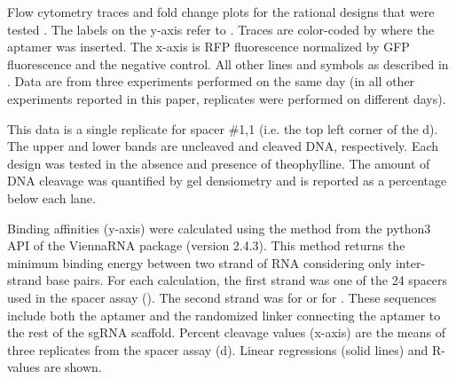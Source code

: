 \documentclass[10pt,oneside]{article}
\begin{document}


      Flow cytometry traces and fold change plots for the rational designs that were tested \invivo{}.  The labels on the y-axis refer to .  Traces are color-coded by where the aptamer was inserted.  The x-axis is RFP fluorescence normalized by GFP fluorescence and the negative control.  All other lines and symbols as described in .  Data are from three experiments performed on the same day (in all other experiments reported in this paper, replicates were performed on different days).



      This data is a single replicate for spacer \#1,1 (i.e. the top left corner of the d).  The upper and lower bands are uncleaved and cleaved DNA, respectively.  Each design was tested in the absence and presence of theophylline.  The amount of DNA cleavage was quantified by gel densiometry and is reported as a percentage below each lane.



     Binding affinities (y-axis) were calculated using the  method from the python3 API of the ViennaRNA package (version 2.4.3).  This method returns the minimum binding energy between two strand of RNA considering only inter-strand base pairs.  For each calculation, the first strand was one of the 24  spacers used in the \invitro{} spacer assay ().  The second strand was  for \ligrnaF{} or  for \ligrnaB{}.  These sequences include both the aptamer and the randomized linker connecting the aptamer to the rest of the sgRNA scaffold.  Percent cleavage values (x-axis) are the means of three replicates from the \invitro{} spacer assay (d).  Linear regressions (solid lines) and R-values are shown.

\end{document}
